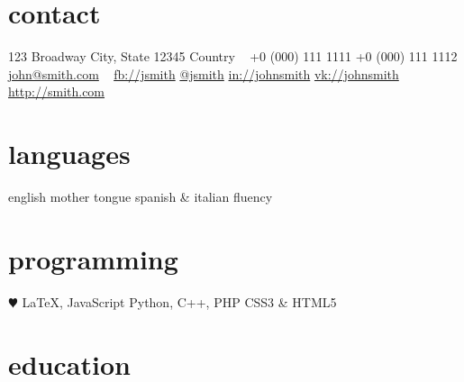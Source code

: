 \documentclass[a4paper]{cv-friggeri-k}
\begin{document}


\begin{aside} %
\section{contact}
{\Large\textcolor{gray}{\faMapMarker}} \hfill 123 Broadway
City, State 12345
Country
~
{\textcolor{gray}{\faPhone}} \hfill +0 (000) 111 1111
{\Large\textcolor{gray}{\faMobilePhone}} \hfill +0 (000) 111 1112
{\textcolor{gray}{\faEnvelope}} \hfill \href{mailto:john@smith.com}{john@smith.com}
~
{\textcolor{gray}{\faFacebook}} \hfill \href{http://facebook.com/johnsmith}{fb://jsmith}
{\textcolor{gray}{\faTwitter}} \hfill \href{http://twitter.com/johnsmith}{@jsmith}
{\textcolor{gray}{\faLinkedin}} \hfill \href{http://linkedin.com/johnsmith}{in://johnsmith}
{\textcolor{gray}{\faVk}} \hfill \href{http://vk.com/johnsmith}{vk://johnsmith}
~
{\textcolor{gray}{\faGlobe}} \hfill \href{http://smith.com}{http://smith.com}
\section{languages}
english mother tongue
spanish \& italian fluency
\section{programming}
{\color{red} $\varheartsuit$} \LaTeX, JavaScript
Python, C++, PHP
CSS3 \& HTML5
\end{aside}


\section{education}
\end{document}
